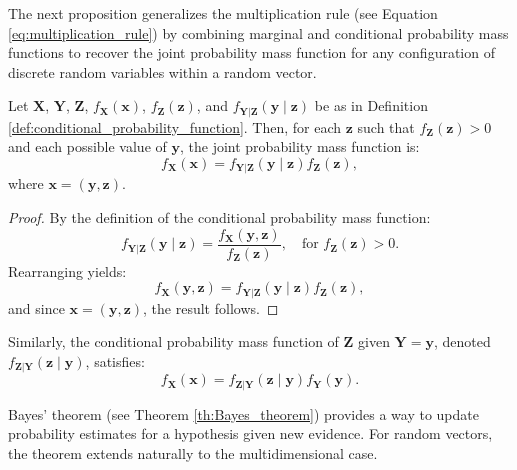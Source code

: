 The next proposition generalizes the multiplication rule (see Equation \ref{eq:multiplication_rule}) by combining marginal and conditional probability mass functions to recover the joint probability mass function for any configuration of discrete random variables within a random vector.

\begin{proposition}
Let $\mathbf{X}$, $\mathbf{Y}$, $\mathbf{Z}$, $f_{\mathbf{X}}(\mathbf{x})$, $f_{\mathbf{Z}}(\mathbf{z})$, and $f_{\mathbf{Y}|\mathbf{Z}}(\mathbf{y} \mid \mathbf{z})$ be as in Definition \ref{def:conditional_probability_function}. Then, for each $\mathbf{z}$ such that $f_{\mathbf{Z}}(\mathbf{z}) > 0$ and each possible value of $\mathbf{y}$, the joint probability mass function is:
\[
f_{\mathbf{X}}(\mathbf{x}) = f_{\mathbf{Y}|\mathbf{Z}}(\mathbf{y} \mid \mathbf{z}) f_{\mathbf{Z}}(\mathbf{z}),
\]
where $\mathbf{x} = (\mathbf{y}, \mathbf{z})$.
\end{proposition}
\begin{proof}
By the definition of the conditional probability mass function:
\[
f_{\mathbf{Y}|\mathbf{Z}}(\mathbf{y} \mid \mathbf{z}) = \frac{f_{\mathbf{X}}(\mathbf{y}, \mathbf{z})}{f_{\mathbf{Z}}(\mathbf{z})}, \quad \text{for } f_{\mathbf{Z}}(\mathbf{z}) > 0.
\]
Rearranging yields:
\[
f_{\mathbf{X}}(\mathbf{y}, \mathbf{z}) = f_{\mathbf{Y}|\mathbf{Z}}(\mathbf{y} \mid \mathbf{z}) f_{\mathbf{Z}}(\mathbf{z}),
\]
and since $\mathbf{x} = (\mathbf{y}, \mathbf{z})$, the result follows.
\end{proof}

Similarly, the conditional probability mass function of $\mathbf{Z}$ given $\mathbf{Y} = \mathbf{y}$, denoted $f_{\mathbf{Z}|\mathbf{Y}}(\mathbf{z} \mid \mathbf{y})$, satisfies:
\[
f_{\mathbf{X}}(\mathbf{x}) = f_{\mathbf{Z}|\mathbf{Y}}(\mathbf{z} \mid \mathbf{y}) f_{\mathbf{Y}}(\mathbf{y}).
\]

Bayes' theorem (see Theorem \ref{th:Bayes_theorem}) provides a way to update probability estimates for a hypothesis given new evidence. For random vectors, the theorem extends naturally to the multidimensional case.

